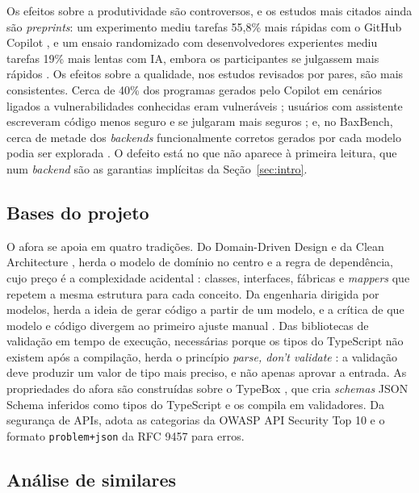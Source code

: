 \documentclass[a4paper,12pt]{article}
\newcommand{\estr}[1]{\textit{#1}}
\begin{document}
Os efeitos sobre a produtividade são controversos, e os estudos mais citados ainda são \estr{preprints}: um experimento mediu tarefas 55,8\% mais rápidas com o GitHub Copilot \citep{peng2023}, e um ensaio randomizado com desenvolvedores experientes mediu tarefas 19\% mais lentas com IA, embora os participantes se julgassem mais rápidos \citep{becker2025}. Os efeitos sobre a qualidade, nos estudos revisados por pares, são mais consistentes. Cerca de 40\% dos programas gerados pelo Copilot em cenários ligados a vulnerabilidades conhecidas eram vulneráveis \citep{pearce2022}; usuários com assistente escreveram código menos seguro e se julgaram mais seguros \citep{perry2023}; e, no BaxBench, cerca de metade dos \estr{backends} funcionalmente corretos gerados por cada modelo podia ser explorada \citep{vero2025}. O defeito está no que não aparece à primeira leitura, que num \estr{backend} são as garantias implícitas da Seção~\ref{sec:intro}.

\subsection{Bases do projeto}

O afora se apoia em quatro tradições. Do Domain-Driven Design \citep{evans2004} e da Clean Architecture \citep{martin2018}, herda o modelo de domínio no centro e a regra de dependência, cujo preço é a complexidade acidental \citep{brooks1987}: classes, interfaces, fábricas e \estr{mappers} que repetem a mesma estrutura para cada conceito. Da engenharia dirigida por modelos, herda a ideia de gerar código a partir de um modelo, e a crítica de que modelo e código divergem ao primeiro ajuste manual \citep{hailpern2006}. Das bibliotecas de validação em tempo de execução, necessárias porque os tipos do TypeScript não existem após a compilação, herda o princípio \estr{parse, don't validate} \citep{king2019}: a validação deve produzir um valor de tipo mais preciso, e não apenas aprovar a entrada. As propriedades do afora são construídas sobre o TypeBox \citep{typebox2026}, que cria \estr{schemas} JSON Schema inferidos como tipos do TypeScript e os compila em validadores. Da segurança de APIs, adota as categorias da OWASP API Security Top 10 \citep{owasp2023} e o formato \texttt{problem+json} da RFC 9457 \citep{rfc9457} para erros.

\subsection{Análise de similares}\label{sec:similares}
\end{document}
